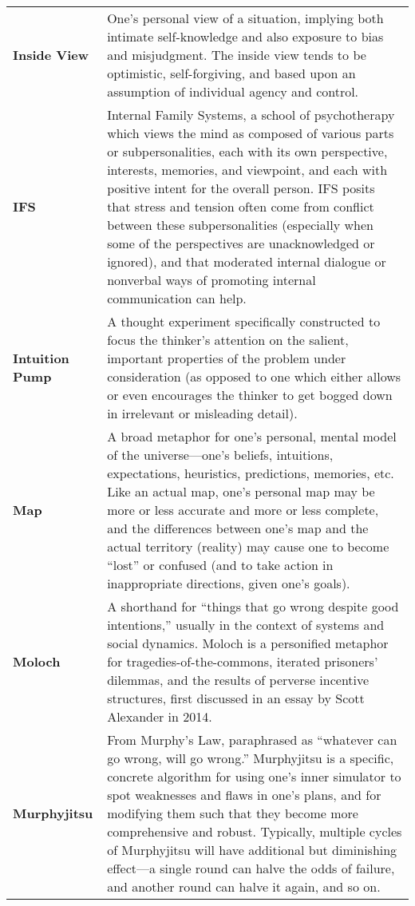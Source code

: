 \begin{longtable} { p{} p{} }
\textbf{Inside View} & One's personal view of a situation, implying both intimate self-knowledge and also exposure to bias and misjudgment.  The inside view tends to be optimistic, self-forgiving, and based upon an assumption of individual agency and control.\\

\textbf{IFS} & Internal Family Systems, a school of psychotherapy which views the mind as composed of various parts or subpersonalities, each with its own perspective, interests, memories, and viewpoint, and each with positive intent for the overall person.  IFS posits that stress and tension often come from conflict between these subpersonalities (especially when some of the perspectives are unacknowledged or ignored), and that moderated internal dialogue or nonverbal ways of promoting internal communication can help.\\

\textbf{Intuition Pump} & A thought experiment specifically constructed to focus the thinker's attention on the salient, important properties of the problem under consideration (as opposed to one which either allows or even encourages the thinker to get bogged down in irrelevant or misleading detail).\\

\textbf{Map} & A broad metaphor for one's personal, mental model of the universe---one's beliefs, intuitions, expectations, heuristics, predictions, memories, etc.  Like an actual map, one's personal map may be more or less accurate and more or less complete, and the differences between one's map and the actual territory (reality) may cause one to become ``lost'' or confused (and to take action in inappropriate directions, given one's goals).\\

\textbf{Moloch} & A shorthand for ``things that go wrong despite good intentions,'' usually in the context of systems and social dynamics.  Moloch is a personified metaphor for tragedies-of-the-commons, iterated prisoners' dilemmas, and the results of perverse incentive structures, first discussed in an essay by Scott Alexander in 2014.\\

\textbf{Murphyjitsu} & From Murphy's Law, paraphrased as ``whatever can go wrong, will go wrong.''  Murphyjitsu is a specific, concrete algorithm for using one's inner simulator to spot weaknesses and flaws in one's plans, and for modifying them such that they become more comprehensive and robust.  Typically, multiple cycles of Murphyjitsu will have additional but diminishing effect---a single round can halve the odds of failure, and another round can halve it again, and so on.\\


\end{longtable}
